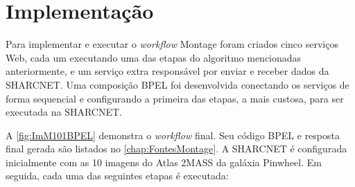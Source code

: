\documentclass[12pt]{report} %
\begin{document}
    
    
    \section{Implementação}
    \label{sec:ImplementacaoReal}
	Para implementar e executar o \textit{workflow} Montage foram criados cinco serviços Web, cada um executando uma das etapas do algoritmo mencionadas anteriormente, e um serviço extra responsável por enviar e receber dados da SHARCNET.
	Uma composição BPEL foi desenvolvida conectando os serviços de forma sequencial e configurando a primeira das etapas, a mais custosa, para ser executada na SHARCNET.
	
	A \autoref{fig:ImM101BPEL} demonstra o \textit{workflow} final. Seu código BPEL e resposta final gerada são listados no \autoref{chap:FontesMontage}.
	A SHARCNET é configurada inicialmente com as 10 imagens do Atlas 2MASS da galáxia Pinwheel.
	Em seguida, cada uma das seguintes etapas é executada:
	
\end{document}

